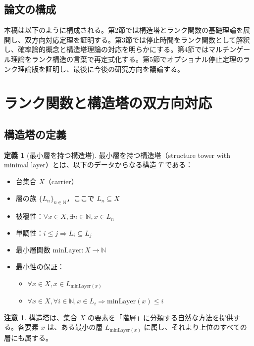 \documentclass[a4paper,11pt]{ltjsarticle}
\theoremstyle{definition}
\newtheorem{definition}[theorem]{定義}
\newtheorem{remark}[theorem]{注意}
\newcommand{\N}{\mathbb{N}}
\begin{document}
\subsection{論文の構成}

本稿は以下のように構成される。第2節では構造塔とランク関数の基礎理論を展開し、双方向対応定理を証明する。第3節では停止時間をランク関数として解釈し、確率論的概念と構造塔理論の対応を明らかにする。第4節ではマルチンゲール理論をランク構造の言葉で再定式化する。第5節でオプショナル停止定理のランク理論版を証明し、最後に今後の研究方向を議論する。

\section{ランク関数と構造塔の双方向対応}

\subsection{構造塔の定義}

\begin{definition}[最小層を持つ構造塔]
最小層を持つ構造塔（structure tower with minimal layer）とは、以下のデータからなる構造 $T$ である：
\begin{itemize}
\item 台集合 $X$（carrier）
\item 層の族 $\{L_n\}_{n \in \N}$，ここで $L_n \subseteq X$
\item 被覆性：$\forall x \in X, \exists n \in \N, x \in L_n$
\item 単調性：$i \leq j \Rightarrow L_i \subseteq L_j$
\item 最小層関数 $\mathrm{minLayer} : X \to \N$
\item 最小性の保証：
  \begin{itemize}
  \item $\forall x \in X, x \in L_{\mathrm{minLayer}(x)}$
  \item $\forall x \in X, \forall i \in \N, x \in L_i \Rightarrow \mathrm{minLayer}(x) \leq i$
  \end{itemize}
\end{itemize}
\end{definition}

\begin{remark}
構造塔は、集合 $X$ の要素を「階層」に分類する自然な方法を提供する。各要素 $x$ は、ある最小の層 $L_{\mathrm{minLayer}(x)}$ に属し、それより上位のすべての層にも属する。
\end{remark}
\end{document}
